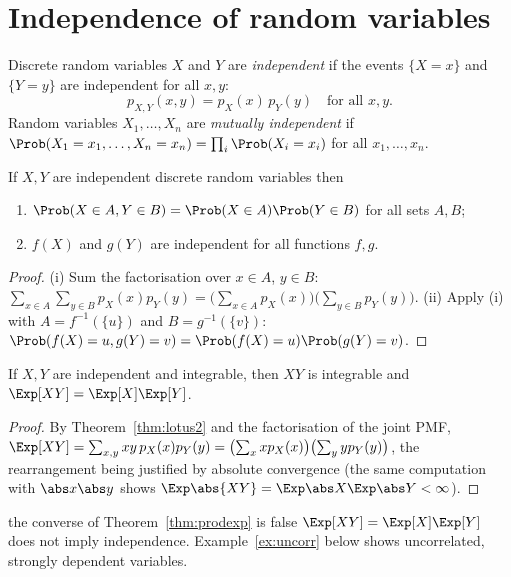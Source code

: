 \section{Independence of random variables}

\begin{definition}
Discrete random variables $X$ and $Y$ are \emph{independent} if the events
$\{X=x\}$ and $\{Y=y\}$ are independent for all $x,y$:
\[
p_{X,Y}(x,y)=p_X(x)\,p_Y(y)\quad\text{for all }x,y.
\]
Random variables $X_1,\dots,X_n$ are \emph{mutually independent} if
$\Prob(X_1=x_1,\dots,X_n=x_n)=\prod_i\Prob(X_i=x_i)$ for all $x_1,\dots,x_n$.
\end{definition}

\begin{proposition}\label{prop:indfun}
If $X,Y$ are independent discrete random variables then
\begin{enumerate}[label=(\roman*)]
\item $\Prob(X\in A,Y\in B)=\Prob(X\in A)\Prob(Y\in B)$ for all sets $A,B$;
\item $f(X)$ and $g(Y)$ are independent for all functions $f,g$.
\end{enumerate}
\end{proposition}
\begin{proof}
(i) Sum the factorisation over $x\in A$, $y\in B$:
$\sum_{x\in A}\sum_{y\in B}p_X(x)p_Y(y)=\bigl(\sum_{x\in A}p_X(x)\bigr)
\bigl(\sum_{y\in B}p_Y(y)\bigr)$.
(ii) Apply (i) with $A=f^{-1}(\{u\})$ and $B=g^{-1}(\{v\})$:
$\Prob(f(X)=u,g(Y)=v)=\Prob(f(X)=u)\Prob(g(Y)=v)$.
\end{proof}

\begin{theorem}\label{thm:prodexp}
If $X,Y$ are independent and integrable, then $XY$ is integrable and
$\Exp[XY]=\Exp[X]\Exp[Y]$.
\end{theorem}
\begin{proof}
By Theorem~\ref{thm:lotus2} and the factorisation of the joint PMF,
$\Exp[XY]=\sum_{x,y}xy\,p_X(x)p_Y(y)=\bigl(\sum_xxp_X(x)\bigr)\bigl(\sum_yyp_Y(y)\bigr)$,
the rearrangement being justified by absolute convergence
(the same computation with $\abs x\abs y$ shows $\Exp\abs{XY}=\Exp\abs X\Exp\abs Y<\infty$).
\end{proof}

\begin{pitfall}{the converse of Theorem~\ref{thm:prodexp} is false}
$\Exp[XY]=\Exp[X]\Exp[Y]$ does not imply independence. Example~\ref{ex:uncorr}
below shows uncorrelated, strongly dependent variables.
\end{pitfall}

